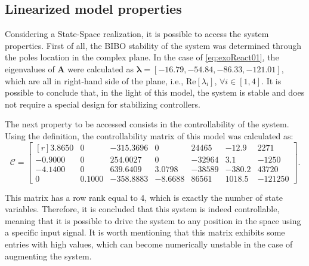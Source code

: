 \documentclass[a4paper,11pt]{book}
\numberwithin{figure}{chapter}
\numberwithin{equation}{chapter}
\numberwithin{table}{chapter}
\theoremstyle{definition}
\begin{document}
%


\subsection{Linearized model properties}

Considering a State-Space realization, it is possible to access the system properties. First of all, the BIBO stability of the system was determined through the poles location in the complex plane. In the case of \eqref{eq:exoReact01}, the eigenvalues of $\bm{A}$ were calculated as $\bm{\lambda} = [-16.79, -54.84, -86.33, -121.01]$, which are all in right-hand side of the plane, i.e., $\text{Re}[\lambda_i]$, $\forall i \in [1,4]$. It is possible to conclude that, in the light of this model, the system is stable and does not require a special design for stabilizing controllers.

The next property to be accessed consists in the controllability of the system. Using the definition, the controllability matrix of this model was calculated as:
\begin{equation}
	\bm{\mathcal{C}} = \begin{bmatrix*}[r]
	 3.8650  &      0 & -315.3696  &       0   &  24465 & -12.9 & 2271  \\
   -0.9000   &      0 &  254.0027  &       0   & -32964 & 3.1  & -1250 \\
   -4.1400  &      0  &  639.6409  &  3.0798   & -38589 & -380.2  & 43720 \\
         0  &  0.1000 & -358.8883  &   -8.6688 &  86561 & 1018.5  & -121250 
	\end{bmatrix*}
.\end{equation}

\noindent This matrix has a row rank equal to 4, which is exactly the number of state variables. Therefore, it is concluded that this system is indeed controllable, meaning that it is possible to drive the system to any position in the space using a specific input signal. It is worth mentioning that this matrix exhibits some entries with high values, which can become numerically unstable in the case of augmenting the system.
\end{document}
